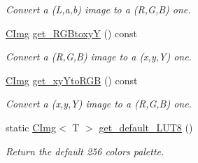 \begin{DoxyCompactItemize}
\begin{DoxyCompactList}\small\item\em Convert a (L,a,b) image to a (R,G,B) one. \item\end{DoxyCompactList}\item 
\hypertarget{structcimg__library_1_1_c_img_a060c6b724b48ae7de997786a95d4d60d}{
\hyperlink{structcimg__library_1_1_c_img}{CImg} \hyperlink{structcimg__library_1_1_c_img_a060c6b724b48ae7de997786a95d4d60d}{get\_\-RGBtoxyY} () const }
\label{structcimg__library_1_1_c_img_a060c6b724b48ae7de997786a95d4d60d}

\begin{DoxyCompactList}\small\item\em Convert a (R,G,B) image to a (x,y,Y) one. \item\end{DoxyCompactList}\item 
\hypertarget{structcimg__library_1_1_c_img_a3f3c8eb02552cb04611f8b583dd25608}{
\hyperlink{structcimg__library_1_1_c_img}{CImg} \hyperlink{structcimg__library_1_1_c_img_a3f3c8eb02552cb04611f8b583dd25608}{get\_\-xyYtoRGB} () const }
\label{structcimg__library_1_1_c_img_a3f3c8eb02552cb04611f8b583dd25608}

\begin{DoxyCompactList}\small\item\em Convert a (x,y,Y) image to a (R,G,B) one. \item\end{DoxyCompactList}\item 
static \hyperlink{structcimg__library_1_1_c_img}{CImg}$<$ T $>$ \hyperlink{structcimg__library_1_1_c_img_a34d519a14c0aed27660fb42d25bf5f74}{get\_\-default\_\-LUT8} ()
\begin{DoxyCompactList}\small\item\em Return the default 256 colors palette. \item\end{DoxyCompactList}\end{DoxyCompactItemize}
